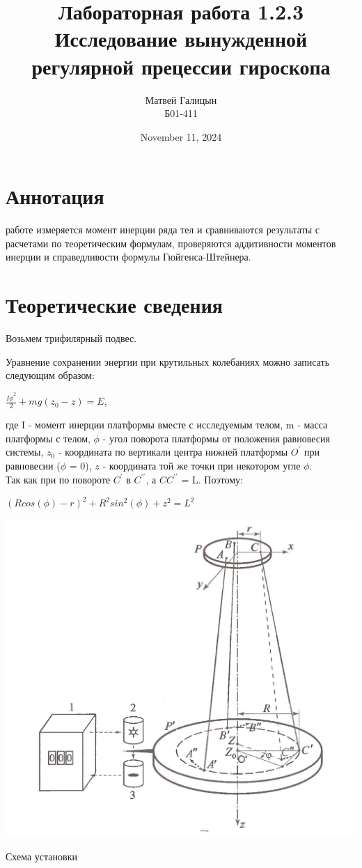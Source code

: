 \documentclass[10px]{article}
\title{Лабораторная работа 1.2.3 \\ Исследование вынужденной регулярной прецессии гироскопа}
\author{Матвей Галицын \\ Б01-411}
\date{November 11, 2024}
\begin{document}
\maketitle

\section{Аннотация}
 работе измеряется момент инерции ряда тел и сравниваются результаты с расчетами по теоретическим формулам, проверяются аддитивности моментов инерции и справедливости формулы Гюйгенса-Штейнера.

\section{Теоретические сведения}
Возьмем трифилярный подвес. \\
\begin{minipage}[h]{0.6\linewidth}
Уравнение сохранении энергии при крутильных колебаниях можно записать следующим образом:
\begin{center}
    $\frac{I {\dot{\phi}}^2}{2} + mg(z_0 - z) = E$,
\end{center}
где I - момент инерции платформы вместе с исследуемым телом, m - масса платформы с телом, $\phi$ - угол поворота платформы от положения равновесия системы, $z_0$ - координата по вертикали центра нижней платформы $O^\prime$ при равновесии ($\phi$ = 0), $z$ - координата той же точки при некотором угле $\phi$.\\
Так как при по повороте $C^\prime$ в $C^{\prime\prime}$, а $CC^{\prime\prime}$ = L. Поэтому: 
\begin{center}
    $(Rcos(\phi) - r)^2 + R^2sin^2(\phi) + z^2 = L^2$
\end{center}
\end{minipage}
\begin{minipage}[h]{0.4\textwidth}
    \centering
	\includegraphics[width=1\linewidth]{1.2.3 ustan.jpg}
    \caption{Схема установки}
\end{minipage} \\
\end{document}
